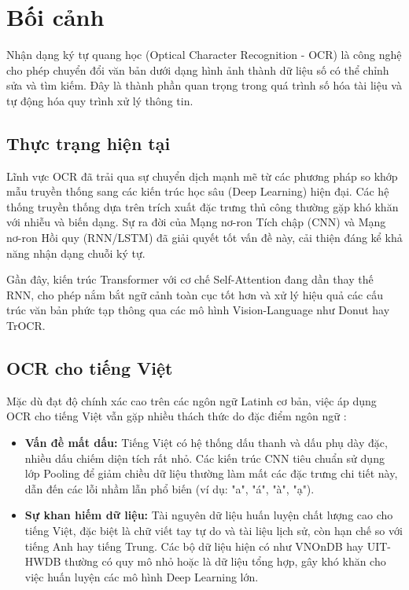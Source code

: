 \section{Bối cảnh}

Nhận dạng ký tự quang học (Optical Character Recognition - OCR) là công nghệ cho phép chuyển đổi văn bản dưới dạng hình ảnh thành dữ liệu số có thể chỉnh sửa và tìm kiếm. Đây là thành phần quan trọng trong quá trình số hóa tài liệu và tự động hóa quy trình xử lý thông tin.

\subsection{Thực trạng hiện tại}

Lĩnh vực OCR đã trải qua sự chuyển dịch mạnh mẽ từ các phương pháp so khớp mẫu truyền thống sang các kiến trúc học sâu (Deep Learning) hiện đại. Các hệ thống truyền thống dựa trên trích xuất đặc trưng thủ công thường gặp khó khăn với nhiễu và biến dạng. Sự ra đời của Mạng nơ-ron Tích chập (CNN) và Mạng nơ-ron Hồi quy (RNN/LSTM) đã giải quyết tốt vấn đề này, cải thiện đáng kể khả năng nhận dạng chuỗi ký tự.

Gần đây, kiến trúc Transformer với cơ chế Self-Attention đang dần thay thế RNN, cho phép nắm bắt ngữ cảnh toàn cục tốt hơn và xử lý hiệu quả các cấu trúc văn bản phức tạp thông qua các mô hình Vision-Language như Donut hay TrOCR.

\subsection{OCR cho tiếng Việt}

Mặc dù đạt độ chính xác cao trên các ngôn ngữ Latinh cơ bản, việc áp dụng OCR cho tiếng Việt vẫn gặp nhiều thách thức do đặc điểm ngôn ngữ \cite{le2025surveyvietnamesedocumentanalysis}:

\begin{itemize}
    \item \textbf{Vấn đề mất dấu:} Tiếng Việt có hệ thống dấu thanh và dấu phụ dày đặc, nhiều dấu chiếm diện tích rất nhỏ. Các kiến trúc CNN tiêu chuẩn sử dụng lớp Pooling để giảm chiều dữ liệu thường làm mất các đặc trưng chi tiết này, dẫn đến các lỗi nhầm lẫn phổ biến (ví dụ: "a", "á", "à", "ạ").
    \item \textbf{Sự khan hiếm dữ liệu:} Tài nguyên dữ liệu huấn luyện chất lượng cao cho tiếng Việt, đặc biệt là chữ viết tay tự do và tài liệu lịch sử, còn hạn chế so với tiếng Anh hay tiếng Trung. Các bộ dữ liệu hiện có như VNOnDB hay UIT-HWDB thường có quy mô nhỏ hoặc là dữ liệu tổng hợp, gây khó khăn cho việc huấn luyện các mô hình Deep Learning lớn.
\end{itemize}

